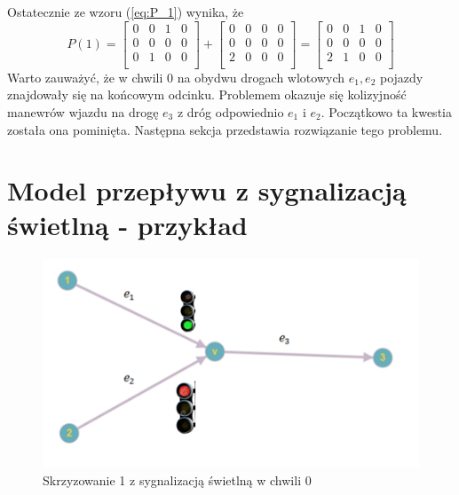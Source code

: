 \documentclass[12pt]{book}
\begin{document}
Ostatecznie ze wzoru (\ref{eq:P_1}) wynika, że
 \[P(1)=\begin{bmatrix}
 0 & 0 & 1 & 0\\
 0 & 0 & 0 & 0\\
 0 & 1 & 0 & 0\\
 \end{bmatrix}+
 \begin{bmatrix}
 0 & 0 & 0 & 0\\
 0 & 0 & 0 & 0\\
 2 & 0 & 0 & 0\\
 \end{bmatrix}=
  \begin{bmatrix}
 0 & 0 & 1 & 0\\
 0 & 0 & 0 & 0\\
 2 & 1 & 0 & 0\\
 \end{bmatrix}
 \]
Warto zauważyć, że w chwili 0 na obydwu drogach wlotowych $e_1,e_2$ pojazdy znajdowały się na końcowym odcinku. Problemem okazuje się kolizyjność manewrów wjazdu na drogę $e_3$ z dróg odpowiednio $e_1$ i $e_2$. Początkowo ta kwestia została ona pominięta. Następna sekcja przedstawia rozwiązanie tego problemu.
\section{Model przepływu z sygnalizacją świetlną - przykład}
\begin{figure}[H]
  \centering
    \includegraphics[width=14cm]{skrz_1_sygnalizacja}
 \caption{Skrzyzowanie 1 z sygnalizacją świetlną w chwili 0}
 \label{fig:skrz_1_sygnalizacja}
\end{figure}
\end{document}
